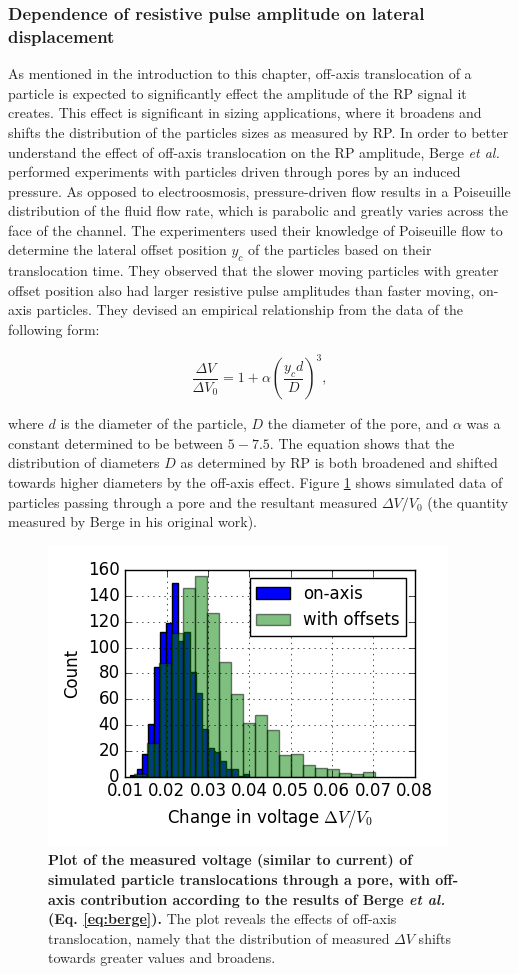 				
			\subsubsection{Dependence of resistive pulse amplitude on lateral displacement}
			
				As mentioned in the introduction to this chapter, off-axis translocation of a particle is expected to significantly effect the amplitude of the RP signal it creates. This effect is significant in sizing applications, where it broadens and shifts the distribution of the particles sizes as measured by RP. In order to better understand the effect of off-axis translocation on the RP amplitude, Berge \emph{et al.} performed experiments with particles driven through pores by an induced pressure. As opposed to electroosmosis, pressure-driven flow results in a Poiseuille distribution of the fluid flow rate, which is parabolic and greatly varies across the face of the channel. The experimenters used their knowledge of Poiseuille flow to determine the lateral offset position $y_{c}$ of the particles based on their translocation time. They observed that the slower moving particles with greater offset position also had larger resistive pulse amplitudes than faster moving, on-axis particles. They devised an empirical relationship from the data of the following form:
				
				\begin{equation} \label{eq:berge}
					\frac{\Delta V}{\Delta V_{0}}=1+\alpha\left(\frac{y_{c} d}{D}\right)^{3},
				\end{equation}
				
				where $d$ is the diameter of the particle, $D$ the diameter of the pore, and $\alpha$ was a constant determined to be between $5-7.5$. The equation shows that the distribution of diameters $D$ as determined by RP is both broadened and shifted towards higher diameters by the off-axis effect. Figure \ref{fig:simulateddV} shows simulated data of particles passing through a pore and the resultant measured $\Delta V/V_{0}$ (the quantity measured by Berge in his original work).
				
				\begin{figure}
					\includegraphics[width=.5\textwidth]{simulated_dV.png}
					\caption{\textbf{Plot of the measured voltage (similar to current) of simulated particle translocations through a pore, with off-axis contribution according to the results of Berge \emph{et al.} (Eq. \ref{eq:berge}).} The plot reveals the effects of off-axis translocation, namely that the distribution of measured $\Delta V$ shifts towards greater values and broadens.}
					\label{fig:simulateddV}
				\end{figure}
				
